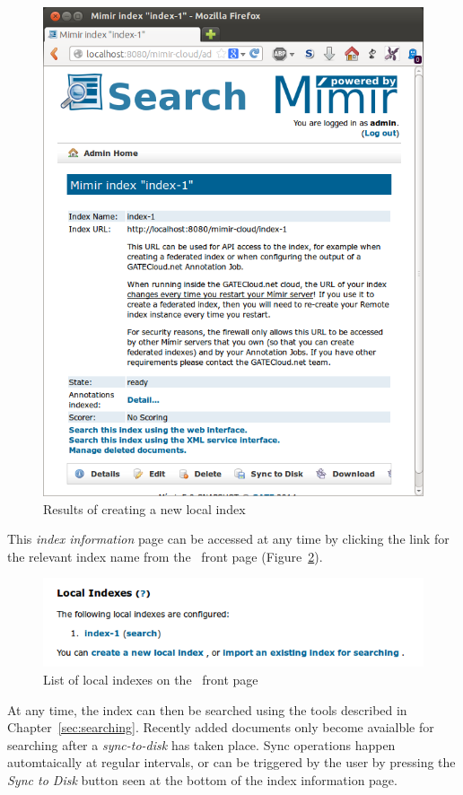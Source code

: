 \begin{figure}[htb!]
\begin{center}
\includegraphics[scale=0.5]{img/local-index-created}
\end{center}
\caption{Results of creating a new local index}
\label{fig:local-index-created}
\end{figure}
%

This {\em index information} page can be accessed at any time by clicking the
link for the relevant index name from the \Mimir\ front page
(Figure~\ref{fig:local-index-list}).
%
\begin{figure}[htb!]
\begin{center}
\includegraphics[scale=0.5]{img/local-index-list}
\end{center}
\caption{List of local indexes on the \Mimir\ front page}
\label{fig:local-index-list}
\end{figure}
%
At any time, the index can then be searched using the tools described in
Chapter~\ref{sec:searching}. Recently added documents only become avaialble for
searching after a {\em sync-to-disk} has taken place. Sync operations happen
automtaically at regular intervals, or can be triggered by the user by pressing
the {\em Sync to Disk} button seen at the bottom of the index information page.

